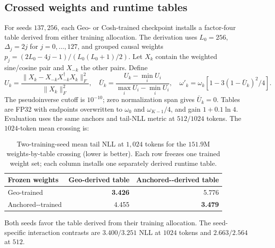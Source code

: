 \subsection{Crossed weights and runtime tables}
\label{sec:crossing-151m}
For seeds $137,256$, each Geo- or Cosh-trained checkpoint installs a factor-four
table derived from either training allocation. The derivation uses
$L_0=256$, $\Delta_j=2j$ for $j=0,\ldots,127$, and grouped causal weights
$p_j=(2L_0-4j-1)/(L_0(L_0+1)/2)$. Let $X_k$ contain the weighted sine/cosine
pair and $X_{-k}$ the other pairs. Define
\[
U_k=\frac{\|X_k-X_{-k}X_{-k}^{\dagger}X_k\|_F^2}{\|X_k\|_F^2},\quad
\bar U_k=\frac{U_k-\min_iU_i}{\max_iU_i-\min_iU_i},\quad
\omega'_k=\omega_k[1-3(1-\bar U_k)^2/4].
\]
The pseudoinverse cutoff is $10^{-10}$; zero normalization span gives
$\bar U_k=0$. Tables are FP32 with endpoints overwritten to $\omega_0$ and
$\omega_{K-1}/4$, and gain $1+0.1\ln4$. Evaluation uses the same anchors and
tail-NLL metric at $512/1024$ tokens. The $1024$-token mean crossing is:
\begin{table}[ht]
\caption{Two-training-seed mean tail NLL at $1{,}024$ tokens for the
$151.9$M weights-by-table crossing (lower is better). Each row freezes one
trained weight set; each column installs one separately derived runtime table.}
\label{tab:crossing-151m}
\centering
\small
\begin{tabular}{@{}lrr@{}}
\toprule
Frozen weights & Geo-derived table & Anchored-\evq{}-derived table \\
\midrule
Geo-trained & \textbf{3.426} & 5.776 \\
Anchored-\evq{}-trained & 4.455 & \textbf{3.479} \\
\bottomrule
\end{tabular}
\end{table}
Both seeds favor the table derived from their training allocation. The
seed-specific interaction contrasts are $3.400/3.251$ NLL at $1024$ tokens
and $2.663/2.564$ at $512$.

